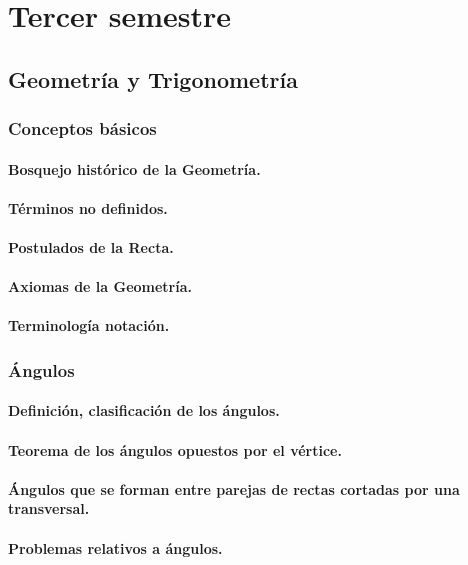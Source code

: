 \part{Tercer semestre}
\chapter{Geometría y Trigonometría} %

\section{Conceptos básicos}
\subsection{Bosquejo histórico de la Geometría.}
\subsection{Términos no definidos.}
\subsection{Postulados de la Recta.}
\subsection{Axiomas de la Geometría.}
\subsection{Terminología notación. }


\section{Ángulos} %
\subsection{Definición, clasificación de los ángulos.}
\subsection{Teorema de los ángulos opuestos por el vértice.}
\subsection{Ángulos que se forman entre parejas de rectas cortadas por una transversal.}
\subsection{Problemas relativos a ángulos. }





